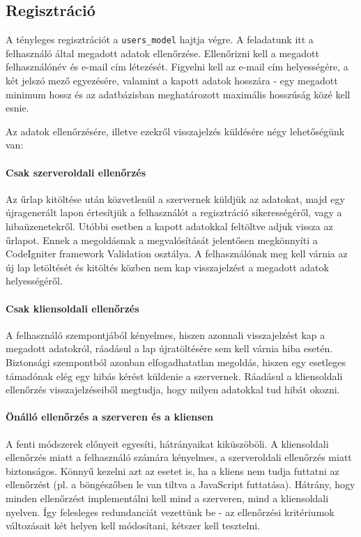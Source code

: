 \documentclass[12pt,a4paper,twoside]{article}
\begin{document}
\subsection{Regisztráció}

A tényleges regisztrációt a \texttt{users\_model} hajtja végre. A feladatunk itt
a felhasználó által megadott adatok ellenőrzése. Ellenőrizni
kell a megadott felhasználónév és e-mail cím létezését. Figyelni kell az e-mail
cím helyességére, a két jelszó mező egyezésére, valamint a kapott adatok
hosszára - egy megadott minimum hossz és az adatbázisban meghatározott
maximális hosszúság közé kell esnie.

Az adatok ellenőrzésére, illetve ezekről visszajelzés küldésére négy
lehetőségünk van:

\paragraph{Csak szerveroldali ellenőrzés}
Az űrlap kitöltése után közvetlenül a szervernek küldjük az adatokat, majd egy
újragenerált lapon értesítjük a felhasználót a regisztráció sikerességéről, vagy
a hibaüzenetekről. Utóbbi esetben a kapott adatokkal feltöltve adjuk vissza az
űrlapot. Ennek a megoldásnak a megvalósítását jelentősen megkönnyíti a
CodeIgniter framework Validation osztálya\cite{CI-Val}. A felhasználónak meg kell várnia az új lap
letöltését és kitöltés közben nem kap visszajelzést a megadott adatok
helyességéről.

\paragraph{Csak kliensoldali ellenőrzés}
A felhasználó szempontjából kényelmes, hiszen azonnali visszajelzést kap a
megadott adatokról, ráadásul a lap újratöltésére sem kell várnia hiba
esetén. Biztonsági szempontból azonban elfogadhatatlan megoldás, hiszen egy
esetleges támadónak elég egy hibás kérést küldenie a szervernek. Ráadásul a
kliensoldali ellenőrzés visszajelzéseiből megtudja, hogy milyen adatokkal tud
hibát okozni.

\paragraph{Önálló ellenőrzés a szerveren és a kliensen}
A fenti módszerek előnyeit egyesíti, hátrányaikat kiküszöböli. A kliensoldali
ellenőrzés miatt a felhasználó számára kényelmes, a szerveroldali ellenőrzés
miatt biztonságos. Könnyű kezelni azt az esetet is, ha a kliens nem tudja
futtatni az ellenőrzést (pl. a böngészőben le van tiltva a JavaScript
futtatása). Hátrány, hogy minden ellenőrzést implementálni kell mind
a szerveren, mind a kliensoldali nyelven. Így felesleges redundanciát vezettünk
be - az ellenőrzési kritériumok változásait két helyen kell módosítani, kétszer
kell tesztelni.
\end{document}
